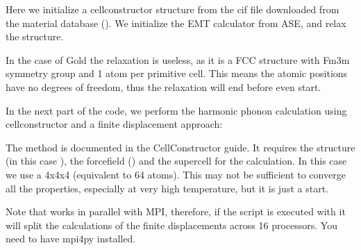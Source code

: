 \documentclass[a4paper,11pt,english]{sphinxmanual}
\begin{document}
\sphinxAtStartPar
Here we initialize a cellconstructor structure from the cif file downloaded from the material database (). We initialize the EMT calculator from ASE, and relax the structure.

\sphinxAtStartPar
In the case of Gold the relaxation is useless, as it is a FCC structure with Fm\sphinxhyphen{}3m symmetry group and 1 atom per primitive cell. This means the atomic positions have no degrees of freedom, thus the relaxation will end before even start.

\sphinxAtStartPar
In the next part of the code, we perform the harmonic phonon calculation using cellconstructor and a finite displacement approach:

\begin{sphinxVerbatim}[commandchars=\\\{\}]
      



\end{sphinxVerbatim}

\sphinxAtStartPar
The method  is documented in the CellConstructor guide. It requires the structure (in this case ), the force\sphinxhyphen{}field () and the supercell for the calculation. In this case we use a 4x4x4 (equivalent to 64 atoms). This may not be sufficient to converge all the properties, especially at very high temperature, but it is just a start.

\sphinxAtStartPar
Note that    works in parallel with MPI, therefore, if the script is executed with  it will split the calculations of the finite displacements across 16 processors. You need to have mpi4py installed.
\end{document}
